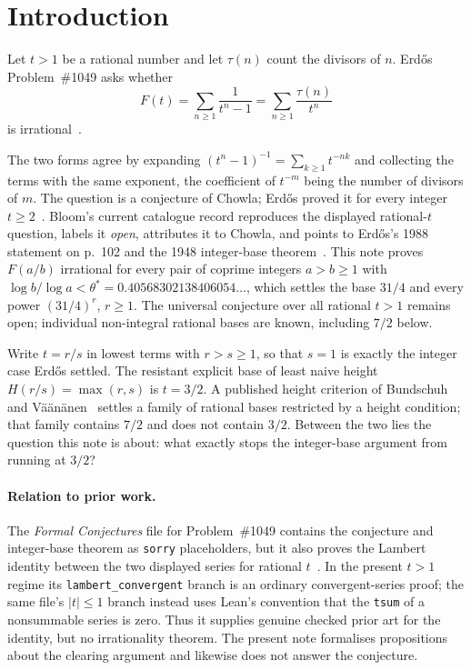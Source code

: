 \documentclass[11pt]{article}
\begin{document}
\section{Introduction}\label{long1049:sec:problem}

Let $t>1$ be a rational number and let $\tau(n)$ count the divisors of $n$.
Erd\H{o}s Problem~\#1049 asks whether
\[
 F(t)=\sum_{n\ge1}\frac{1}{t^{n}-1}=\sum_{n\ge1}\frac{\tau(n)}{t^{n}}
\]
is irrational~\cite[p.~102]{erdos1988}.

The two forms agree by expanding
$(t^{n}-1)^{-1}=\sum_{k\ge1}t^{-nk}$ and collecting the terms with the same
exponent, the coefficient of $t^{-m}$ being the number of divisors of $m$.
The question is a conjecture of Chowla; Erd\H{o}s proved it for every integer
$t\ge2$~\cite{erdos1948}.  Bloom's current catalogue record reproduces the
displayed rational-\(t\) question, labels it \emph{open}, attributes it to
Chowla, and points to Erd\H{o}s's 1988 statement on p.~102 and the 1948
integer-base theorem~\cite{erdosproblems}.  This note proves $F(a/b)$
irrational for every pair of coprime integers $a>b\ge1$ with
$\log b/\log a<\theta^{*}=0.40568302138406054\ldots$, which settles the base
$31/4$ and every power $(31/4)^{r}$, $r\ge1$.  The universal conjecture over
all rational $t>1$ remains open; individual non-integral rational bases are
known, including $7/2$ below.

Write $t=r/s$ in lowest terms with $r>s\ge1$, so that $s=1$ is exactly the
integer case Erd\H{o}s settled.  The resistant explicit base of least naive
height $H(r/s)=\max(r,s)$ is $t=3/2$.  A published height criterion of Bundschuh and
V\"a\"an\"anen~\cite[Thm.~2, p.~177; hypotheses pp.~175--176]{bv1994}
settles a family of rational bases restricted by a
height condition; that family contains $7/2$ and does not contain $3/2$.
Between the two lies the question this note is about: what exactly stops the
integer-base argument from running at $3/2$?

\paragraph{Relation to prior work.}
The \emph{Formal Conjectures} file for Problem~\#1049 contains the conjecture
and integer-base theorem as \texttt{sorry} placeholders, but it also proves
the Lambert identity between the two displayed series for rational
$t$~\cite{formalconjectures1049}.  In the present $t>1$ regime its
\texttt{lambert\_convergent} branch is an ordinary convergent-series proof;
the same file's $|t|\le1$ branch instead uses Lean's convention that the
\texttt{tsum} of a nonsummable series is zero.  Thus it supplies genuine
checked prior art for the identity, but no irrationality theorem.  The present
note formalises propositions about the clearing argument and likewise does
not answer the conjecture.
\end{document}
